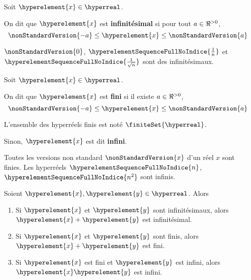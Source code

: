 \begin{definition} [Infinitésimal]
	Soit $\hyperelement{x} \in \hyperreal$.

	On dit que $\hyperelement{x}$ est \textbf{infinitésimal} si pour tout $a \in
	\real^{> 0}$,
	\begin{equation}
		\nonStandardVersion{-a} \leq \hyperelement{x} \leq \nonStandardVersion{a}
	\end{equation}
\end{definition}

\begin{exemple}
	$\nonStandardVersion{0}$, $\hyperelementSequenceFullNoIndice{\frac{1}{n}}$ et
	$\hyperelementSequenceFullNoIndice{\frac{1}{\sqrt{n}}}$ sont des infinitésimaux.
\end{exemple}

\begin{definition} 
	Soit $\hyperelement{x} \in \hyperreal$.

	On dit que $\hyperelement{x}$ est \textbf{fini} si il existe $a \in \real^{> 0}$,
	\begin{equation}
		\nonStandardVersion{-a} \leq \hyperelement{x} \leq \nonStandardVersion{a}
	\end{equation}

	L'ensemble des hyperréels finis est noté $\finiteSet{\hyperreal}$.

	Sinon, $\hyperelement{x}$ est dit \textbf{infini}.
\end{definition}

\begin{exemple}
	Toutes les versions non standard $\nonStandardVersion{x}$ d'un réel $x$ sont
	finies. Les hyperréels $\hyperelementSequenceFullNoIndice{n}$,
	$\hyperelementSequenceFullNoIndice{n^{2}}$ sont infinis.
\end{exemple}

\begin{proposition}
	Soient $\hyperelement{x}, \hyperelement{y} \in \hyperreal$. Alors

	\begin{enumerate}
		\item Si $\hyperelement{x}$ et $\hyperelement{y}$ sont infinitésimaux,
			alors $\hyperelement{x} + \hyperelement{y}$ est infinitésimal.
		\item Si $\hyperelement{x}$ et $\hyperelement{y}$ sont finis, alors
			$\hyperelement{x} + \hyperelement{y}$ est fini.
		\item Si $\hyperelement{x}$ est fini et $\hyperelement{y}$ est infini,
			alors $\hyperelement{x} \hyperelement{y}$ est infini.
	\end{enumerate}
\end{proposition}

